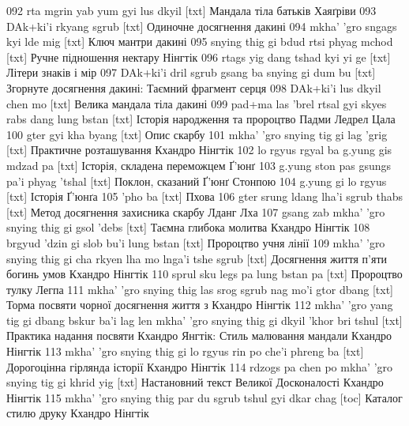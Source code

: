 \documentclass{article}
\begin{document}
092 rta mgrin yab yum gyi lus dkyil [txt] Мандала тіла батьків Хаяґріви
093 DAk+ki'i rkyang sgrub [txt] Одиночне досягнення дакині
094 mkha' 'gro sngags kyi lde mig [txt] Ключ мантри дакині
095 snying thig gi bdud rtsi phyag mchod [txt] Ручне підношення нектару Нінгтік
096 rtags yig dang tshad kyi yi ge [txt] Літери знаків і мір
097 DAk+ki'i dril sgrub gsang ba snying gi dum bu [txt] Згорнуте досягнення дакині: Таємний фрагмент серця
098 DAk+ki'i lus dkyil chen mo [txt] Велика мандала тіла дакині
099 pad+ma las 'brel rtsal gyi skyes rabs dang lung bstan [txt] Історія народження та пророцтво Падми Ледрел Цала
100 gter gyi kha byang [txt] Опис скарбу
101 mkha' 'gro snying tig gi lag 'grig [txt] Практичне розташування Кхандро Нінгтік
102 lo rgyus rgyal ba g.yung gis mdzad pa [txt] Історія, складена переможцем Ґ'юнґ
103 g.yung ston pas gsungs pa'i phyag 'tshal [txt] Поклон, сказаний Ґ'юнґ Стонпою
104 g.yung gi lo rgyus [txt] Історія Ґ'юнґа
105 'pho ba [txt] Пхова
106 gter srung ldang lha'i sgrub thabs [txt] Метод досягнення захисника скарбу Лданг Лха
107 gsang zab mkha' 'gro snying thig gi gsol 'debs [txt] Таємна глибока молитва Кхандро Нінгтік
108 brgyud 'dzin gi slob bu'i lung bstan [txt] Пророцтво учня лінії
109 mkha' 'gro snying thig gi cha rkyen lha mo lnga'i tshe sgrub [txt] Досягнення життя п'яти богинь умов Кхандро Нінгтік
110 sprul sku legs pa lung bstan pa [txt] Пророцтво тулку Легпа
111 mkha' 'gro snying thig las srog sgrub nag mo'i gtor dbang [txt] Торма посвяти чорної досягнення життя з Кхандро Нінгтік
112 mkha' 'gro yang tig gi dbang bskur ba'i lag len mkha' 'gro snying thig gi dkyil 'khor bri tshul [txt] Практика надання посвяти Кхандро Янгтік: Стиль малювання мандали Кхандро Нінгтік
113 mkha' 'gro snying thig gi lo rgyus rin po che'i phreng ba [txt] Дорогоцінна гірлянда історії Кхандро Нінгтік
114 rdzogs pa chen po mkha' 'gro snying tig gi khrid yig [txt] Настановний текст Великої Досконалості Кхандро Нінгтік
115 mkha' 'gro snying thig par du sgrub tshul gyi dkar chag [toc] Каталог стилю друку Кхандро Нінгтік
\end{document}

